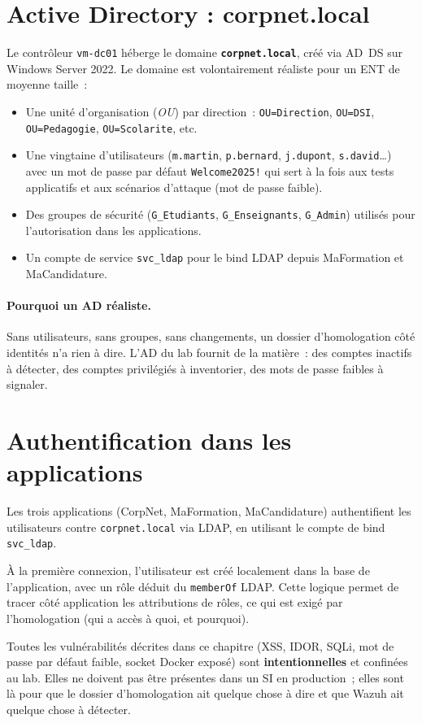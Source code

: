 \section{Active Directory : corpnet.local}

Le contrôleur \texttt{vm-dc01} héberge le domaine
\textbf{\texttt{corpnet.local}}, créé via AD~DS sur Windows Server
2022. Le domaine est volontairement réaliste pour un ENT de
moyenne taille~:

\begin{itemize}
  \item Une unité d'organisation (\emph{OU}) par direction~:
    \texttt{OU=Direction}, \texttt{OU=DSI}, \texttt{OU=Pedagogie},
    \texttt{OU=Scolarite}, etc.
  \item Une vingtaine d'utilisateurs (\texttt{m.martin},
    \texttt{p.bernard}, \texttt{j.dupont}, \texttt{s.david}\ldots)
    avec un mot de passe par défaut \texttt{Welcome2025!} qui
    sert à la fois aux tests applicatifs et aux scénarios
    d'attaque (mot de passe faible).
  \item Des groupes de sécurité (\texttt{G\_Etudiants},
    \texttt{G\_Enseignants}, \texttt{G\_Admin}) utilisés pour
    l'autorisation dans les applications.
  \item Un compte de service \texttt{svc\_ldap} pour le bind LDAP
    depuis MaFormation et MaCandidature.
\end{itemize}

\paragraph{Pourquoi un AD réaliste.}
Sans utilisateurs, sans groupes, sans changements, un dossier
d'homologation côté identités n'a rien à dire. L'AD du lab fournit
de la matière~: des comptes inactifs à détecter, des comptes
privilégiés à inventorier, des mots de passe faibles à signaler.

\section{Authentification dans les applications}

Les trois applications (CorpNet, MaFormation, MaCandidature)
authentifient les utilisateurs contre \texttt{corpnet.local} via
LDAP, en utilisant le compte de bind \texttt{svc\_ldap}.

À la première connexion, l'utilisateur est créé localement dans
la base de l'application, avec un rôle déduit du
\texttt{memberOf} LDAP. Cette logique permet de tracer
côté application les attributions de rôles, ce qui est exigé par
l'homologation (qui a accès à quoi, et pourquoi).

\begin{warning}
Toutes les vulnérabilités décrites dans ce chapitre (XSS, IDOR,
SQLi, mot de passe par défaut faible, socket Docker exposé) sont
\textbf{intentionnelles} et confinées au lab. Elles ne doivent
pas être présentes dans un SI en production~; elles sont là
pour que le dossier d'homologation ait quelque chose à dire et
que Wazuh ait quelque chose à détecter.
\end{warning}
